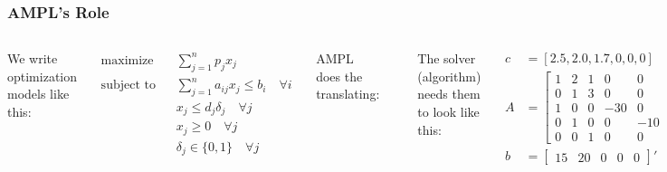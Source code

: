\frame
{
	\frametitle{AMPL's Role}
	
	\begin{columns}
	
	\column[t]{1in}
	
	We write optimization models like this:

	\vspace{-1em}
	
	{\scriptsize
	\begin{align*}
	\text{maximize} \quad & \sum_{j=1}^n p_jx_j \\
	\text{subject to} \quad & \sum_{j=1}^n a_{ij}x_j \le b_i \quad \forall i \\
		& x_j \le d_j\delta_j \quad \forall j \\
		& x_j \ge 0 \quad \forall j \\
		& \delta_j \in \{0,1\} \quad \forall j
	\end{align*}
	}

	\column[t]{1in}
	
	 {
	AMPL does the translating:
	
	\vspace{3em}
	
	\begin{center}
	\end{center}
	}
	
	\column[t]{1in}
	
	 {
	The solver (algorithm) needs them to look like this:
	
	{\tiny
	\begin{align*}
	c & = [2.5, 2.0, 1.7, 0, 0, 0] \\
	A & = \left[\begin{matrix} 1 & 2 & 1 & 0 & 0 & 0 \\
						0 & 1 & 3 & 0 & 0 & 0 \\
						1 & 0 & 0 & -30 & 0 & 0 \\
						0 & 1 & 0 & 0 & -10 & 0 \\
						0 & 0 & 1 & 0 & 0 & -15 \end{matrix}\right] \\
	b & = \left[\begin{matrix} 15 & 20 & 0 & 0 & 0 \end{matrix} \right]'
	\end{align*}
	}
	}

	\end{columns}
	
}



